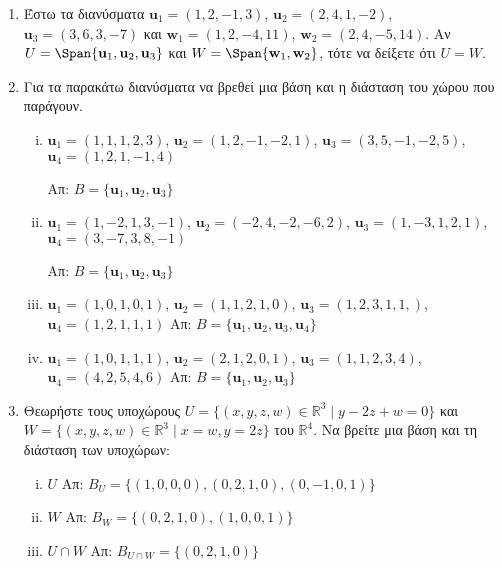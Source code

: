 \documentclass[a4paper,table]{report}
\begin{document}
\begin{enumerate}
  \item\label{ask:isoi} Έστω τα διανύσματα $ \mathbf{u}_{1} = (1,2,-1,3)$, 
    $\mathbf{u}_{2} = (2,4,1,-2)$, $ \mathbf{u} _{3} = (3,6,3,-7) $ και 
    $ \mathbf{w}_{1} = (1,2,-4,11)$, $ \mathbf{w}_{2} = (2,4,-5,14) $. 
    Αν $ U = \Span \{ \mathbf{u}_{1}, \mathbf{u}_{2}, \mathbf{u}_{3} \} $ και 
    $ W = \Span \{ \mathbf{w}_{1}, \mathbf{w}_{2} \} $, τότε να δείξετε ότι $ U=W $.

  \item\label{ask:parag2} Για τα παρακάτω διανύσματα να βρεθεί μια βάση και η διάσταση 
    του χώρου που παράγουν.
    \begin{enumerate}[(i)]
      \item $ \mathbf{u}_{1} = (1,1,1,2,3) $, $ \mathbf{u}_{2} = (1,2,-1,-2,1) $, 
        $ \mathbf{u} _{3} = (3,5,-1,-2,5) $, $ \mathbf{u}_{4} = (1,2,1,-1,4) $

        \hfill Απ: $ B = \{ \mathbf{u}_{1}, \mathbf{u}_{2}, \mathbf{u}_{3}\} $ 

      \item $ \mathbf{u}_{1} = (1,-2,1,3,-1) $, $ \mathbf{u}_{2} = (-2,4,-2,-6,2) $, $
        \mathbf{u}_{3} = (1,-3,1,2,1) $, $ \mathbf{u}_{4} = (3,-7,3,8,-1) $

        \hfill Απ: $ B = \{ \mathbf{u}_{1}, \mathbf{u}_{2}, \mathbf{u}_{3} \} $ 

      \item $ \mathbf{u}_{1} = (1,0,1,0,1) $, $ \mathbf{u}_{2} = (1,1,2,1,0) $, 
        $ \mathbf{u} _{3} = (1,2,3,1,1,) $, $ \mathbf{u}_{4} = (1,2,1,1,1) $
        \hfill Απ: $ B = \{ \mathbf{u}_{1}, \mathbf{u}_{2}, \mathbf{u}_{3}, 
        \mathbf{u}_{4} \} $ 

      \item $ \mathbf{u}_{1} = (1,0,1,1,1) $, $ \mathbf{u}_{2} = (2,1,2,0,1) $, 
        $ \mathbf{u} _{3} = (1,1,2,3,4) $, $ \mathbf{u}_{4} = (4,2,5,4,6) $
        \hfill Απ: $ B = \{ \mathbf{u}_{1}, \mathbf{u}_{2}, \mathbf{u}_{3} \} $ 
    \end{enumerate}

  \item Θεωρήστε τους υποχώρους 
    $ U = \{ (x,y,z,w) \in \mathbb{R}^{3} \mid y - 2z + w = 0 \} $ και 
    $ W = \{ (x,y,z,w) \in \mathbb{R}^{3} \mid x = w, y = 2z \} $ του 
    $\mathbb{R}^{4}$. Να βρείτε μια βάση και τη διάσταση των υποχώρων:
    \begin{enumerate}[(i)]
      \item $ U $ \hfill Απ: $ B_{U} = \{ (1,0,0,0), (0,2,1,0), (0,-1,0,1) \} $ 
      \item $ W $ \hfill Απ: $ B_{W} = \{ (0,2,1,0), (1,0,0,1) \} $ 
      \item $ U \cap W $ \hfill Απ: $ B_{U\cap W} = \{ (0,2,1,0) \} $ 
    \end{enumerate}	


\end{enumerate}
\end{document}
